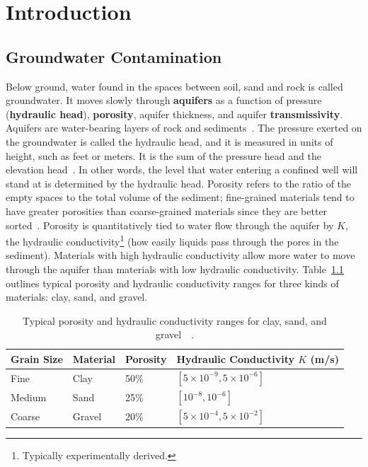  \chapter{Introduction}
\label{introchap}
\section{Groundwater Contamination}
Below ground, water found in the spaces between soil, sand and rock
is called groundwater. It moves slowly through
\textbf{aquifers} as a function of pressure (\textbf{hydraulic head}), \textbf{porosity},
aquifer thickness, and aquifer \textbf{transmissivity}. Aquifers are
water-bearing layers of rock and sediments~\cite{basics}. The pressure exerted on the groundwater is called
the hydraulic head, and it is measured in units of height, such as
feet or meters. It is the sum of the pressure head and the elevation head~\cite{basics}. In other words,
the level that water entering a confined well will stand at is
determined by the hydraulic head. Porosity refers to the ratio of the empty
spaces to the total volume of the sediment; fine-grained materials tend to
have greater porosities than coarse-grained materials since they are
better sorted~\cite{basics}. Porosity is quantitatively tied to water flow through
the aquifer by $K$, the hydraulic conductivity\footnote{Typically
  experimentally derived.} (how easily liquids pass through the pores in the sediment). Materials with high hydraulic conductivity allow more water
 to move through the aquifer than materials with low hydraulic
 conductivity. Table~\ref{tbl:porosity} outlines typical
porosity and hydraulic conductivity ranges for three kinds of materials: clay, sand, and
 gravel.
\begin {table}[H]\linespread{1}
\caption [Typical porosity and hydraulic conductivity ranges for clay, sand, and gravel]{Typical
  porosity and hydraulic conductivity ranges for clay, sand, and gravel~\cite{basics}~\cite{geotechdata}.} \label{tbl:porosity}
\begin{center}
    \begin{tabular}{ l l l l}
    \hline
    Grain Size & Material & Porosity & Hydraulic Conductivity $K$
    (m/s)\\ 
\hline
    Fine & Clay  &  50\% &$[5\times 10^{-9}, 5\times 10^{-6}]$\\ 
    Medium &  Sand & 25\% & $[10^{-8},10^{-6}]$\\ 
    Coarse &  Gravel &  20\% & $[5 \times 10^{-4}, 5 \times 10^{-2}]$\\ 
    \end{tabular}
\end{center}
\end{table}
